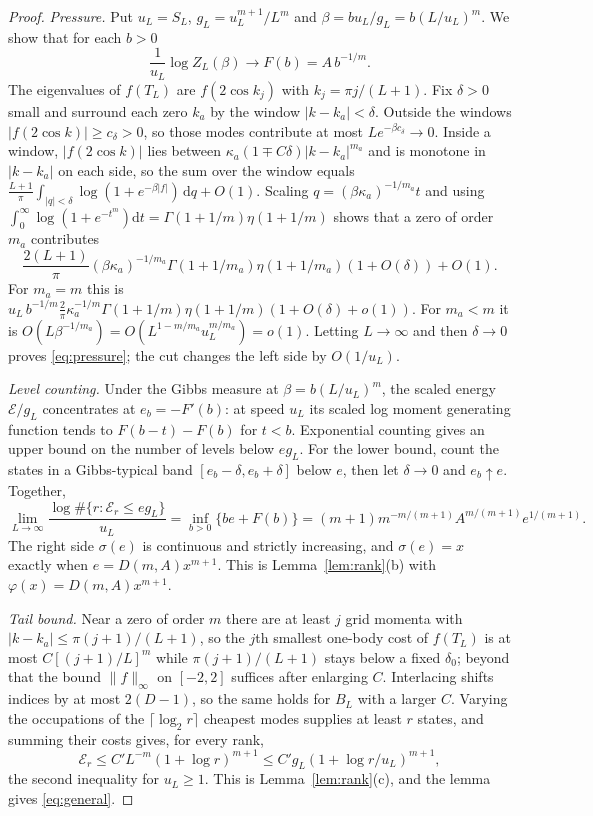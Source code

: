\documentclass[11pt,a4paper]{article}
\theoremstyle{remark}
\newcommand{\dd}{\mathrm d}
\begin{document}
\begin{proof}
\emph{Pressure.} Put $u_L=S_L$, $g_L=u_L^{m+1}/L^m$ and $\beta=bu_L/g_L=b(L/u_L)^m$. We show that for each $b>0$
\begin{equation}
 \frac{1}{u_L}\log Z_L(\beta)\to F(b)=A\,b^{-1/m}.
 \label{eq:pressure}
\end{equation}
The eigenvalues of $f(T_L)$ are $f(2\cos k_j)$ with $k_j=\pi j/(L+1)$. Fix $\delta>0$ small and surround each zero $k_a$ by the window $|k-k_a|<\delta$. Outside the windows $|f(2\cos k)|\ge c_\delta>0$, so those modes contribute at most $Le^{-\beta c_\delta}\to0$. Inside a window, $|f(2\cos k)|$ lies between $\kappa_a(1\mp C\delta)|k-k_a|^{m_a}$ and is monotone in $|k-k_a|$ on each side, so the sum over the window equals $\frac{L+1}{\pi}\int_{|q|<\delta}\log(1+e^{-\beta|f|})\,\dd q+O(1)$. Scaling $q=(\beta\kappa_a)^{-1/m_a}t$ and using $\int_0^\infty\log(1+e^{-t^{m}})\dd t=\Gamma(1+1/m)\eta(1+1/m)$ shows that a zero of order $m_a$ contributes
\[
 \frac{2(L+1)}{\pi}(\beta\kappa_a)^{-1/m_a}\Gamma(1+1/m_a)\eta(1+1/m_a)(1+O(\delta))+O(1).
\]
For $m_a=m$ this is $u_L\,b^{-1/m}\tfrac2\pi\kappa_a^{-1/m}\Gamma(1+1/m)\eta(1+1/m)(1+O(\delta)+o(1))$. For $m_a<m$ it is $O(L\beta^{-1/m_a})=O(L^{1-m/m_a}u_L^{m/m_a})=o(1)$. Letting $L\to\infty$ and then $\delta\to0$ proves \eqref{eq:pressure}; the cut changes the left side by $O(1/u_L)$.

\emph{Level counting.} Under the Gibbs measure at $\beta=b(L/u_L)^m$, the scaled energy $\mathcal E/g_L$ concentrates at $e_b=-F'(b)$: at speed $u_L$ its scaled log moment generating function tends to $F(b-t)-F(b)$ for $t<b$. Exponential counting gives an upper bound on the number of levels below $eg_L$. For the lower bound, count the states in a Gibbs-typical band $[e_b-\delta,e_b+\delta]$ below $e$, then let $\delta\to0$ and $e_b\uparrow e$. Together,
\begin{equation}
 \lim_{L\to\infty}\frac{\log\#\{r:\mathcal E_r\le e g_L\}}{u_L}
 =\inf_{b>0}\{be+F(b)\}
 =(m+1)m^{-m/(m+1)}A^{m/(m+1)}e^{1/(m+1)} .
 \label{eq:micro}
\end{equation}
The right side $\sigma(e)$ is continuous and strictly increasing, and $\sigma(e)=x$ exactly when $e=D(m,A)x^{m+1}$. This is Lemma~\ref{lem:rank}(b) with $\varphi(x)=D(m,A)x^{m+1}$.

\emph{Tail bound.} Near a zero of order $m$ there are at least $j$ grid momenta with $|k-k_a|\le\pi(j+1)/(L+1)$, so the $j$th smallest one-body cost of $f(T_L)$ is at most $C[(j+1)/L]^m$ while $\pi(j+1)/(L+1)$ stays below a fixed $\delta_0$; beyond that the bound $\|f\|_{\infty}$ on $[-2,2]$ suffices after enlarging $C$. Interlacing shifts indices by at most $2(D-1)$, so the same holds for $B_L$ with a larger $C$. Varying the occupations of the $\lceil\log_2r\rceil$ cheapest modes supplies at least $r$ states, and summing their costs gives, for every rank,
\begin{equation}
 \mathcal E_r\le C' L^{-m}(1+\log r)^{m+1}\le C'g_L(1+\log r/u_L)^{m+1},
 \label{eq:tail}
\end{equation}
the second inequality for $u_L\ge1$. This is Lemma~\ref{lem:rank}(c), and the lemma gives \eqref{eq:general}.
\end{proof}
\end{document}
